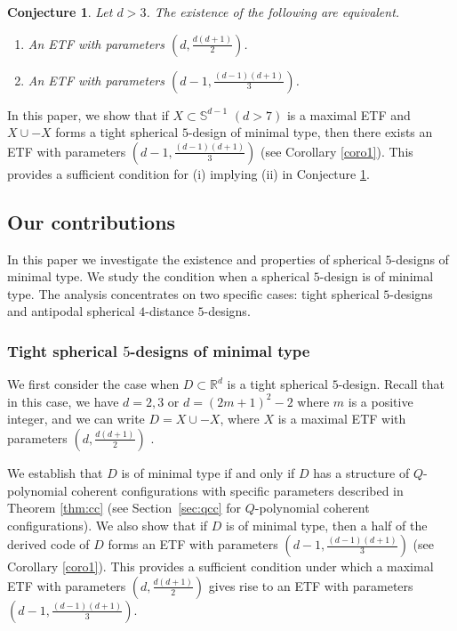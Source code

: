\documentclass[11pt]{article}
\newtheorem{conjecture}{Conjecture}[section]
\theoremstyle{definition}
\theoremstyle{remark}
\begin{document}
\begin{conjecture}\label{conj1}
Let $d>3$. The existence of the following are equivalent.
\begin{enumerate}
	\item [\rm (i)] An ETF with parameters $(d,\frac{d(d+1)}{2})$.
	\item [\rm (ii)] An ETF with parameters $(d-1,\frac{(d-1)(d+1)}{3})$.
\end{enumerate}
	
\end{conjecture}

In this paper, we  show that if $X\subset\mathbb{S}^{d-1}$ $(d>7)$ is a maximal ETF and $X\cup -X$ forms a tight spherical $5$-design of minimal type,  
then there exists an ETF with parameters $(d-1,\frac{(d-1)(d+1)}{3})$ (see Corollary \ref{coro1}).  
This provides a sufficient condition for (i) implying (ii) in Conjecture \ref{conj1}. 


\subsection{Our contributions}


In this paper we investigate the existence and properties of spherical $5$-designs of minimal type. 
We study the condition when a spherical $5$-design is of minimal type. 
The analysis concentrates on two specific cases: tight spherical $5$-designs and antipodal spherical $4$-distance $5$-designs.

\subsubsection{Tight spherical $5$-designs of minimal type}

We first consider the case when $D\subset\mathbb{R}^d$ is a tight spherical $5$-design. 
Recall that in this case, we have $d=2,3$ or $d=(2m+1)^2-2$ where $m$ is a positive integer,
and we can write $D=X\cup -X$, where $X$ is a maximal ETF with parameters $(d,\frac{d(d+1)}{2})$ \cite{BB09b}.

We establish that $D$ is of minimal type if and only if $D$ has a structure of $Q$-polynomial coherent configurations with specific  parameters described in Theorem \ref{thm:cc} (see  Section~\ref{sec:qcc} for $Q$-polynomial coherent configurations).
We also show that if $D$ is of minimal type, then a half of the derived code of $D$ forms an ETF with parameters $(d-1,\frac{(d-1)(d+1)}{3})$ (see Corollary \ref{coro1}).  
This provides a sufficient condition under which a maximal ETF with parameters $(d,\frac{d(d+1)}{2})$ gives rise to an ETF with parameters $(d-1,\frac{(d-1)(d+1)}{3})$.
\end{document}
